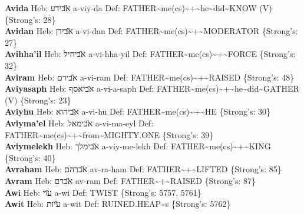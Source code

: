 {\textbf{Avida} Heb: {\large\H אבידע} a-viy-da Def: FATHER\textasciitilde{}me(cs)\textasciitilde{}+\textasciitilde{}he\textasciitilde{}did\textasciitilde{}KNOW (V) \{Strong's: 28\}\hfill{}\\

\textbf{Avidan} Heb: {\large\H אבידן} a-vi-dan Def: FATHER\textasciitilde{}me(cs)\textasciitilde{}+\textasciitilde{}MODERATOR \{Strong's: 27\}\hfill{}\\

\textbf{Avihha'il} Heb: {\large\H אביחיל} a-vi-hha-yil Def: FATHER\textasciitilde{}me(cs)\textasciitilde{}+\textasciitilde{}FORCE \{Strong's: 32\}\hfill{}\\

\textbf{Aviram} Heb: {\large\H אבירם} a-vi-ram Def: FATHER\textasciitilde{}me(cs)\textasciitilde{}+\textasciitilde{}RAISED \{Strong's: 48\}\hfill{}\\

\textbf{Aviyasaph} Heb: {\large\H אביאסף} a-vi-a-saph Def: FATHER\textasciitilde{}me(cs)\textasciitilde{}+\textasciitilde{}he\textasciitilde{}did\textasciitilde{}GATHER (V) \{Strong's: 23\}\hfill{}\\

\textbf{Aviyhu} Heb: {\large\H אביהוא} a-vi-hu Def: FATHER\textasciitilde{}me(cs)\textasciitilde{}+\textasciitilde{}HE \{Strong's: 30\}\hfill{}\\

\textbf{Aviyma'el} Heb: {\large\H אבימאל} a-vi-ma-eyl Def: FATHER\textasciitilde{}me(cs)\textasciitilde{}+\textasciitilde{}from\textasciitilde{}MIGHTY.ONE \{Strong's: 39\}\hfill{}\\

\textbf{Aviymelekh} Heb: {\large\H אבימלך} a-viy-me-lekh Def: FATHER\textasciitilde{}me(cs)\textasciitilde{}+\textasciitilde{}KING \{Strong's: 40\}\hfill{}\\

\textbf{Avraham} Heb: {\large\H אברהם} av-ra-ham Def: FATHER\textasciitilde{}+\textasciitilde{}LIFTED \{Strong's: 85\}\hfill{}\\

\textbf{Avram} Heb: {\large\H אברם} av-ram Def: FATHER\textasciitilde{}+\textasciitilde{}RAISED \{Strong's: 87\}\hfill{}\\

\textbf{Awi} Heb: {\large\H עוי} a-wi Def: TWIST \{Strong's: 5757, 5761\}\hfill{}\\

\textbf{Awit} Heb: {\large\H עיות} a-wit Def: RUINED.HEAP\textasciitilde{}s \{Strong's: 5762\}\hfill{}\\

}
